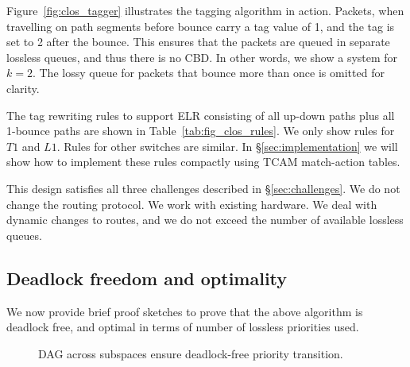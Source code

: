 Figure~\ref{fig:clos_tagger} illustrates the tagging algorithm in action.
Packets, when travelling on path segments before bounce carry a tag value of 1,
and the tag is set to 2 after the bounce. This ensures that the packets are
queued in separate lossless queues, and thus there is no CBD. In other words, we
show a system for $k=2$. The lossy queue for packets that bounce more than once
is omitted for clarity.

The tag rewriting rules to support ELR consisting of all up-down paths plus all
1-bounce paths are shown in Table~\ref{tab:fig_clos_rules}. We only show rules
for $T1$ and $L1$. Rules for other switches are similar. In
\S\ref{sec:implementation} we will show how to implement these rules compactly
using TCAM match-action tables. 

This design satisfies all three challenges described in \S\ref{sec:challenges}.
We do not change the routing protocol. We work with existing hardware. We deal
with dynamic changes to routes, and we do not exceed the number of available
lossless queues.

\subsection {Deadlock freedom and optimality}
\label{subsec:specific_deadlock_free}

We now provide brief proof sketches to prove that the above algorithm is
deadlock free, and optimal in terms of number of lossless priorities used.

\begin{figure}[t]
	\centering
	
	
	\caption{DAG across subspaces ensure deadlock-free priority transition.}\label{fig:subspace}
\end{figure}


